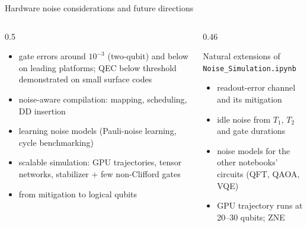 \documentclass[aspectratio=169,11pt]{beamer}
\begin{document}
\begin{frame}[label=fFuture]{Hardware noise considerations and future directions}
  \begin{columns}[T]
    \begin{column}{0.5\textwidth}
      \small
      \begin{itemize}\itemsep2pt
        \item gate errors around $10^{-3}$ (two-qubit) and below on leading platforms; QEC below threshold demonstrated on small surface codes
        \item noise-aware compilation: mapping, scheduling, DD insertion
        \item learning noise models (Pauli-noise learning, cycle benchmarking)
        \item scalable simulation: GPU trajectories, tensor networks, stabilizer + few non-Clifford gates
        \item from mitigation to logical qubits
      \end{itemize}
    \end{column}
    \begin{column}{0.46\textwidth}
      \begin{block}{Natural extensions of \texttt{Noise\_Simulation.ipynb}}
        \scriptsize
        \begin{itemize}\itemsep1pt
          \item readout-error channel and its mitigation
          \item idle noise from $T_1$, $T_2$ and gate durations
          \item noise models for the other notebooks' circuits (QFT, QAOA, VQE)
          \item GPU trajectory runs at 20--30 qubits; ZNE
        \end{itemize}
      \end{block}
    \end{column}
  \end{columns}
\end{frame}
\end{document}
